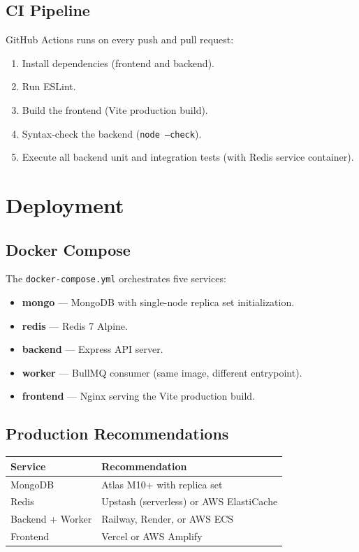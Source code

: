 \documentclass[12pt,a4paper]{article}
\begin{document}
\subsection{CI Pipeline}
GitHub Actions runs on every push and pull request:
\begin{enumerate}[leftmargin=1.5cm]
    \item Install dependencies (frontend and backend).
    \item Run ESLint.
    \item Build the frontend (Vite production build).
    \item Syntax-check the backend (\texttt{node --check}).
    \item Execute all backend unit and integration tests (with Redis service container).
\end{enumerate}

\section{Deployment}

\subsection{Docker Compose}
The \texttt{docker-compose.yml} orchestrates five services:
\begin{itemize}[leftmargin=1.5cm]
    \item \textbf{mongo} --- MongoDB with single-node replica set initialization.
    \item \textbf{redis} --- Redis 7 Alpine.
    \item \textbf{backend} --- Express API server.
    \item \textbf{worker} --- BullMQ consumer (same image, different entrypoint).
    \item \textbf{frontend} --- Nginx serving the Vite production build.
\end{itemize}

\subsection{Production Recommendations}
\begin{longtable}{p{3.5cm} p{10.5cm}}
\toprule
\textbf{Service} & \textbf{Recommendation} \\
\midrule
MongoDB & Atlas M10+ with replica set \\
Redis & Upstash (serverless) or AWS ElastiCache \\
Backend + Worker & Railway, Render, or AWS ECS \\
Frontend & Vercel or AWS Amplify \\
\bottomrule
\end{longtable}
\end{document}
